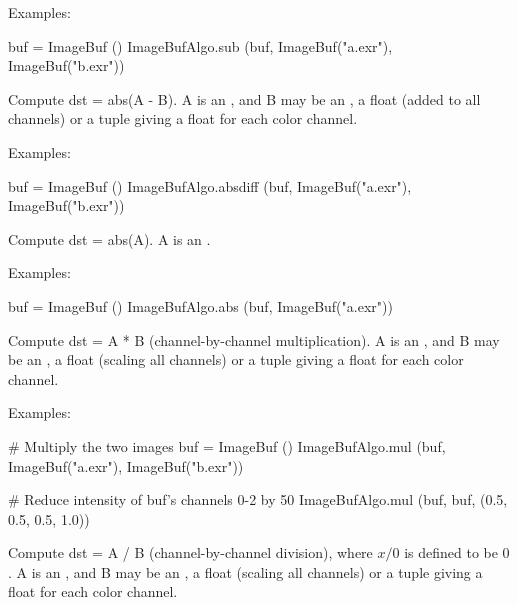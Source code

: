 \smallskip
\noindent Examples:
\begin{code}
    buf = ImageBuf ()
    ImageBufAlgo.sub (buf, ImageBuf("a.exr"), ImageBuf("b.exr"))
\end{code}
\apiend


 

Compute {\cf dst = abs(A - B)}.  {\cf A} is an \ImageBuf, and {\cf B}  may
be an \ImageBuf, a {\cf float} (added to all channels) or a tuple giving a
{\cf float} for each color channel.

\smallskip
\noindent Examples:
\begin{code}
    buf = ImageBuf ()
    ImageBufAlgo.absdiff (buf, ImageBuf("a.exr"), ImageBuf("b.exr"))
\end{code}
\apiend


 

Compute {\cf dst = abs(A)}.  {\cf A} is an \ImageBuf.

\smallskip
\noindent Examples:
\begin{code}
    buf = ImageBuf ()
    ImageBufAlgo.abs (buf, ImageBuf("a.exr"))
\end{code}
\apiend


 

Compute {\cf dst} = {\cf A * B} (channel-by-channel multiplication).  {\cf A}
is an \ImageBuf, and {\cf B}  may be an \ImageBuf, a {\cf float} (scaling
all channels) or a tuple giving a {\cf float} for each color channel.

\smallskip
\noindent Examples:
\begin{code}
    # Multiply the two images
    buf = ImageBuf ()
    ImageBufAlgo.mul (buf, ImageBuf("a.exr"), ImageBuf("b.exr"))

    # Reduce intensity of buf's channels 0-2 by 50%
    ImageBufAlgo.mul (buf, buf, (0.5, 0.5, 0.5, 1.0))
\end{code}
\apiend


 

Compute {\cf dst} = {\cf A / B} (channel-by-channel division), where $x/0$
is defined to be $0$.  {\cf A} is an \ImageBuf, and {\cf B}  may be an
\ImageBuf, a {\cf float} (scaling all channels) or a tuple giving a {\cf
float} for each color channel.

